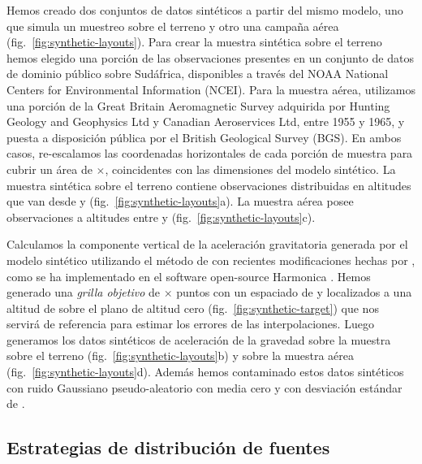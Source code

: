 Hemos creado dos conjuntos de datos sintéticos a partir del mismo modelo, uno
que simula un muestreo sobre el terreno y otro una campaña aérea
(fig.~\ref{fig:synthetic-layouts}).
Para crear la muestra sintética sobre el terreno hemos elegido una porción de
las observaciones presentes en un conjunto de datos de dominio público sobre
Sudáfrica, disponibles a través del NOAA National Centers for Environmental
Information (NCEI). Para la muestra aérea, utilizamos una porción de la Great
Britain Aeromagnetic Survey adquirida por Hunting Geology and Geophysics Ltd
y Canadian Aeroservices Ltd, entre 1955 y 1965, y puesta a disposición pública
por el British Geological Survey (BGS).
En ambos casos, re-escalamos las coordenadas horizontales de cada porción de
muestra para cubrir un área de \SurveyEasting{}$\times$\SurveyNorthing{},
coincidentes con las dimensiones del modelo sintético.
La muestra sintética sobre el terreno contiene \GroundSurveyPoints{}
observaciones distribuidas en altitudes que van desde \GroundSurveyMinHeight{}
y \GroundSurveyMaxHeight{} (fig.~\ref{fig:synthetic-layouts}a).
La muestra aérea posee \AirborneSurveyPoints{} observaciones a altitudes entre
\AirborneSurveyMinHeight{} y \AirborneSurveyMaxHeight{}
(fig.~\ref{fig:synthetic-layouts}c).

Calculamos la componente vertical de la aceleración gravitatoria generada por
el modelo sintético utilizando el método de \citet{nagy2000, nagy2002} con
recientes modificaciones hechas por \citet{fukushima2020}, como se ha
implementado en el software open-source Harmonica \citep{harmonica2021}.
Hemos generado una \emph{grilla objetivo} de
\TargetEastingSize{}$\times$\TargetNorthingSize{} puntos con un espaciado de
\TargetSpacing{} y localizados a una altitud de \TargetHeight{} sobre el plano
de altitud cero (fig.~\ref{fig:synthetic-target}) que nos servirá de referencia
para estimar los errores de las interpolaciones.
Luego generamos los datos sintéticos de aceleración de la gravedad sobre la
muestra sobre el terreno (fig.~\ref{fig:synthetic-layouts}b) y sobre la muestra
aérea (fig.~\ref{fig:synthetic-layouts}d).
Además hemos contaminado estos datos sintéticos con ruido Gaussiano
pseudo-aleatorio con media cero y con desviación estándar de \SurveyNoise{}.


\subsection{Estrategias de distribución de fuentes}
\label{sec:synthetic_distributions}

